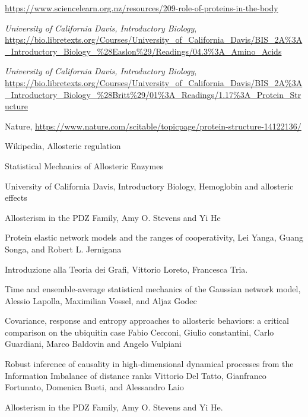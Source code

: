 \documentclass[English, Lau, oneside]{sapthesis}
\begin{document}
\newpage
\begin{thebibliography}{100}

    \url{https://www.sciencelearn.org.nz/resources/209-role-of-proteins-in-the-body}
    
    \emph{University of California Davis, Introductory Biology}, 
    \url{https://bio.libretexts.org/Courses/University_of_California_Davis/BIS_2A%3A_Introductory_Biology_%28Easlon%29/Readings/04.3%3A_Amino_Acids}
    
    \emph{University of California Davis, Introductory Biology}, 
    \url{https://bio.libretexts.org/Courses/University_of_California_Davis/BIS_2A%3A_Introductory_Biology_%28Britt%29/01%3A_Readings/1.17%3A_Protein_Structure}
    
    Nature, \url{https://www.nature.com/scitable/topicpage/protein-structure-14122136/}
    
    Wikipedia, Allosteric regulation 
    
    Statistical Mechanics of Allosteric Enzymes
    
    University of California Davis, Introductory Biology, Hemoglobin and allosteric effects
    
    Allosterism in the PDZ Family, Amy O. Stevens and Yi He
    
    Protein elastic network models and the ranges of cooperativity, Lei Yanga, Guang Songa, and Robert L. Jernigana
    
    Introduzione alla Teoria dei Grafi, Vittorio Loreto, Francesca Tria.
    
    Time and ensemble-average statistical mechanics of the Gaussian network model, Alessio Lapolla, Maximilian Vossel, and Aljaz Godec
    
    Covariance, response and entropy approaches to allosteric behaviors: a critical comparison on the ubiquitin case Fabio Cecconi, Giulio constantini, Carlo Guardiani, Marco Baldovin and Angelo Vulpiani
    
    Robust inference of causality in high-dimensional dynamical processes from the Information Imbalance of distance ranks
    Vittorio Del Tatto, Gianfranco Fortunato, Domenica Bueti, and Alessandro Laio
    
    Allosterism in the PDZ Family, Amy O. Stevens and Yi He.

    
\end{thebibliography}
\end{document}
